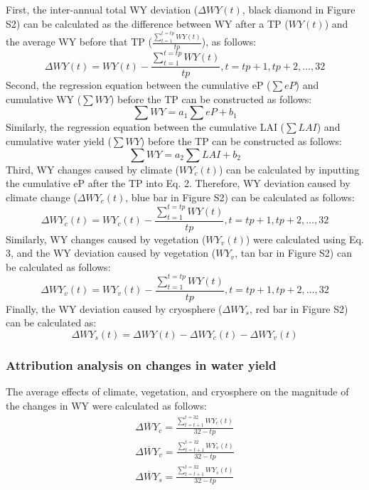 \documentclass[hess, manuscript]{copernicus}
\begin{document}
First, the inter-annual total WY deviation ($\Delta WY(t)$, black diamond in Figure S2) can be calculated as the difference between WY after a TP ($WY(t)$) and the average WY before that TP ($\frac{\sum_{t=1}^{t=tp}WY(t)} {tp}$), as follows:
\begin{equation}
\Delta WY(t)=WY(t)-\frac{\sum_{t=1}^{t=tp} WY(t)}{tp}, t=tp+1, tp+2, \ldots, 32
\end{equation}
Second, the regression equation between the cumulative eP ($\sum eP$) and cumulative WY ($\sum WY$) before the TP can be constructed as follows:
\begin{equation}
\sum WY = a_1\sum eP + b_1
\end{equation}
Similarly, the regression equation between the cumulative LAI ($\sum LAI$) and cumulative water yield ($\sum WY$) before the TP can be constructed as follows:
\begin{equation}
\sum WY = a_2\sum LAI + b_2
\end{equation}
Third, WY changes caused by climate ($WY_c(t)$) can be calculated by inputting the cumulative eP after the TP into Eq. 2. Therefore, WY deviation caused by climate change ($\Delta WY_c(t)$, blue bar in Figure S2) can be calculated as follows:
\begin{equation}
\Delta WY_{c}(t)=WY_{c}(t)-\frac{\sum_{t=1}^{t=tp}WY(t)}{tp}, t=tp+1, tp+2, \ldots, 32
\end{equation}
Similarly, WY changes caused by vegetation ($WY_v(t)$) were calculated using Eq. 3, and the WY deviation caused by vegetation ($WY_v$, tan bar in Figure S2) can be calculated as follows:
\begin{equation}
\Delta WY_{v}(t)=WY_{v}(t)-\frac{\sum_{t=1}^{t=tp}WY(t)}{tp}, t=tp+1, tp+2, \ldots, 32
\end{equation}
Finally, the WY deviation caused by cryosphere ($\Delta WY_s$, red bar in Figure S2) can be calculated as:
\begin{equation}
\Delta WY_{s}(t)=\Delta WY(t)-\Delta WY_{c}(t)-\Delta WY_{v}(t)
\end{equation}

\subsubsection{Attribution analysis on changes in water yield}
The average effects of climate, vegetation, and cryosphere on the magnitude of the changes in WY were calculated as follows:
\begin{equation}
    \begin{split}
    \overline{\Delta WY_{c}}=\frac{\sum_{t=t+1}^{t=32} WY_{c}(t)}{32-tp}\\
    \overline{\Delta WY_{v}}=\frac{\sum_{t=t+1}^{t=32} WY_{v}(t)}{32-tp}\\
    \overline{\Delta WY_{s}}=\frac{\sum_{t=t+1}^{t=32} WY_{s}(t)}{32-tp}
    \end{split}
\end{equation}
\end{document}
